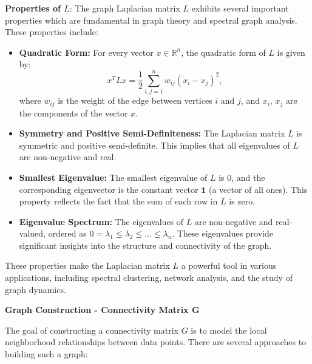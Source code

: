 \documentclass[unicode,11pt,a4paper,oneside,numbers=endperiod,openany]{scrartcl}
\begin{document}
\textbf{Properties of \( L \)}:
The graph Laplacian matrix \( L \) exhibits several important properties which are fundamental in graph theory and spectral graph analysis. These properties include:

\begin{itemize}
    \item \textbf{Quadratic Form:} For every vector \( x \in \mathbb{R}^n \), the quadratic form of \( L \) is given by:
    \[
    x^T L x = \frac{1}{2} \sum_{i,j=1}^{n} w_{ij} (x_i - x_j)^2,
    \]
    where \( w_{ij} \) is the weight of the edge between vertices \( i \) and \( j \), and \( x_i \), \( x_j \) are the components of the vector \( x \).

    \item \textbf{Symmetry and Positive Semi-Definiteness:} The Laplacian matrix \( L \) is symmetric and positive semi-definite. This implies that all eigenvalues of \( L \) are non-negative and real.

    \item \textbf{Smallest Eigenvalue:} The smallest eigenvalue of \( L \) is \( 0 \), and the corresponding eigenvector is the constant vector \( \mathbf{1} \) (a vector of all ones). This property reflects the fact that the sum of each row in \( L \) is zero.

    \item \textbf{Eigenvalue Spectrum:} The eigenvalues of \( L \) are non-negative and real-valued, ordered as \( 0 = \lambda_1 \leq \lambda_2 \leq \ldots \leq \lambda_n \). These eigenvalues provide significant insights into the structure and connectivity of the graph.
\end{itemize}

These properties make the Laplacian matrix \( L \) a powerful tool in various applications, including spectral clustering, network analysis, and the study of graph dynamics.
\newline \newline

\textbf{Graph Construction - Connectivity Matrix G}

The goal of constructing a connectivity matrix \( G \) is to model the local neighborhood relationships between data points. There are several approaches to building such a graph:
\end{document}

